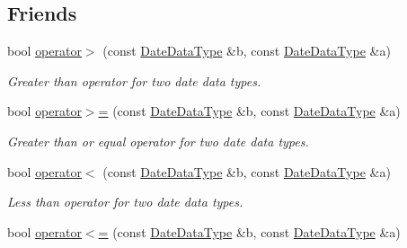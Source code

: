 \subsection*{Friends}
\begin{DoxyCompactItemize}
\item 
bool \hyperlink{structpc__emulator_1_1DateDataType_a4805be1fb4c5c4fd44e6564f9604f408}{operator$>$} (const \hyperlink{structpc__emulator_1_1DateDataType}{Date\+Data\+Type} \&b, const \hyperlink{structpc__emulator_1_1DateDataType}{Date\+Data\+Type} \&a)\hypertarget{structpc__emulator_1_1DateDataType_a4805be1fb4c5c4fd44e6564f9604f408}{}\label{structpc__emulator_1_1DateDataType_a4805be1fb4c5c4fd44e6564f9604f408}

\begin{DoxyCompactList}\small\item\em Greater than operator for two date data types. \end{DoxyCompactList}\item 
bool \hyperlink{structpc__emulator_1_1DateDataType_a05edaaf7e40132b6fa696fcb3f9d7d2a}{operator$>$=} (const \hyperlink{structpc__emulator_1_1DateDataType}{Date\+Data\+Type} \&b, const \hyperlink{structpc__emulator_1_1DateDataType}{Date\+Data\+Type} \&a)\hypertarget{structpc__emulator_1_1DateDataType_a05edaaf7e40132b6fa696fcb3f9d7d2a}{}\label{structpc__emulator_1_1DateDataType_a05edaaf7e40132b6fa696fcb3f9d7d2a}

\begin{DoxyCompactList}\small\item\em Greater than or equal operator for two date data types. \end{DoxyCompactList}\item 
bool \hyperlink{structpc__emulator_1_1DateDataType_a421869fc7034a7a2eddfbc551e647a87}{operator$<$} (const \hyperlink{structpc__emulator_1_1DateDataType}{Date\+Data\+Type} \&b, const \hyperlink{structpc__emulator_1_1DateDataType}{Date\+Data\+Type} \&a)\hypertarget{structpc__emulator_1_1DateDataType_a421869fc7034a7a2eddfbc551e647a87}{}\label{structpc__emulator_1_1DateDataType_a421869fc7034a7a2eddfbc551e647a87}

\begin{DoxyCompactList}\small\item\em Less than operator for two date data types. \end{DoxyCompactList}\item 
bool \hyperlink{structpc__emulator_1_1DateDataType_a12abd9fdecb799462ddb9f784241a6d1}{operator$<$=} (const \hyperlink{structpc__emulator_1_1DateDataType}{Date\+Data\+Type} \&b, const \hyperlink{structpc__emulator_1_1DateDataType}{Date\+Data\+Type} \&a)\hypertarget{structpc__emulator_1_1DateDataType_a12abd9fdecb799462ddb9f784241a6d1}{}\label{structpc__emulator_1_1DateDataType_a12abd9fdecb799462ddb9f784241a6d1}


\end{DoxyCompactItemize}
